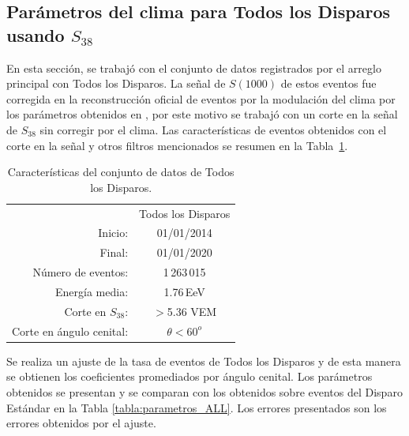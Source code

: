 \subsection{Parámetros del clima para Todos los Disparos usando $S_{38}$}


En esta sección, se trabajó con el conjunto de datos registrados por el arreglo principal con Todos los Disparos. La señal de $S(1000)$ de estos eventos fue corregida en la reconstrucción oficial de eventos por la modulación del clima por los parámetros obtenidos en \cite{aab2017impact}, por este motivo se trabajó con un corte en la señal de $S_{38}$ sin corregir por el clima. Las características de eventos obtenidos con el corte en la señal y otros filtros mencionados se resumen en la Tabla~\ref{tabla:caracteristicas_ALL}. 

\begin{table}[H]
  \centering
  \begin{tabular}{r|c|}
    \cline{2-2}
                & Todos los Disparos \\ \cline{2-2}
  Inicio:              & 01/01/2014\\ 
  Final:               & 01/01/2020       							\\ 
  Número de eventos:   & 1\,263\,015							\\ 
  Energía media:       & 1.76\,EeV       				\\  %
  Corte en $S_{38}$:   & $>$5.36 VEM        				\\ 
  Corte en ángulo cenital:& $\theta < 60^o$ 				\\ \cline{2-2}
  \end{tabular}
\caption{Características del conjunto de datos de Todos los Disparos.} \label{tabla:caracteristicas_ALL}
\end{table}

Se realiza un ajuste de la tasa de eventos de Todos los Disparos y de esta manera se obtienen los coeficientes promediados por ángulo cenital. Los parámetros obtenidos se presentan y se comparan con los obtenidos sobre eventos del Disparo Estándar \cite{aab2017impact} en la Tabla \ref{tabla:parametros_ALL}. Los errores presentados son los errores obtenidos por el ajuste.  


